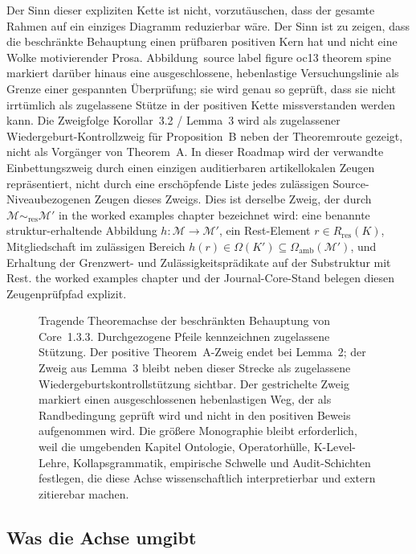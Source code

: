 Der Sinn dieser expliziten Kette ist nicht, vorzutäuschen, dass der gesamte Rahmen auf ein einziges
Diagramm reduzierbar wäre. Der Sinn ist zu zeigen, dass die beschränkte Behauptung einen prüfbaren
positiven Kern hat und nicht eine Wolke motivierender Prosa. Abbildung~source label figure oc13 theorem spine
markiert darüber hinaus eine ausgeschlossene, hebenlastige Versuchungslinie als Grenze einer
gespannten Überprüfung; sie wird genau so geprüft, dass sie nicht irrtümlich als zugelassene Stütze in der
positiven Kette missverstanden werden kann. Die Zweigfolge Korollar~3.2 / Lemma~3 wird als zugelassener
Wiedergeburt-Kontrollzweig für Proposition~B neben der Theoremroute gezeigt, nicht als Vorgänger von
Theorem~A. In dieser Roadmap wird der verwandte Einbettungszweig durch einen einzigen auditierbaren
artikellokalen Zeugen repräsentiert, nicht durch eine erschöpfende Liste jedes zulässigen Source-
Niveaubezogenen Zeugen dieses Zweigs. Dies ist derselbe Zweig, der durch
\(\mathcal{M}\sim_{\mathrm{res}}\mathcal{M}'\) in
the worked examples chapter bezeichnet wird: eine benannte struktur-erhaltende Abbildung
\(h:\mathcal{M}\to\mathcal{M}'\), ein Rest-Element
\(r\in R_{\mathrm{res}}(K)\),
Mitgliedschaft im zulässigen Bereich
\(h(r)\in\Omega(K')\subseteq\Omega_{\mathrm{amb}}(\mathcal{M}')\),
und Erhaltung der Grenzwert- und Zulässigkeitsprädikate auf der Substruktur mit Rest. the worked examples chapter
und der Journal-Core-Stand belegen diesen Zeugenprüfpfad explizit.

\begin{figure}[htbp]
\centering

\caption{Tragende Theoremachse der beschränkten Behauptung von Core~1.3.3. Durchgezogene Pfeile
kennzeichnen zugelassene Stützung. Der positive Theorem~A-Zweig endet bei Lemma~2; der Zweig aus
Lemma~3 bleibt neben dieser Strecke als zugelassene Wiedergeburtskontrollstützung sichtbar.
Der gestrichelte Zweig markiert einen ausgeschlossenen hebenlastigen Weg, der als Randbedingung geprüft
wird und nicht in den positiven Beweis aufgenommen wird. Die größere Monographie bleibt erforderlich,
weil die umgebenden Kapitel Ontologie, Operatorhülle, K-Level-Lehre, Kollapsgrammatik, empirische
Schwelle und Audit-Schichten festlegen, die diese Achse wissenschaftlich interpretierbar und extern
zitierebar machen.}
\label{fig:oc13-theorem-spine}
\end{figure}

\subsection{Was die Achse umgibt}

